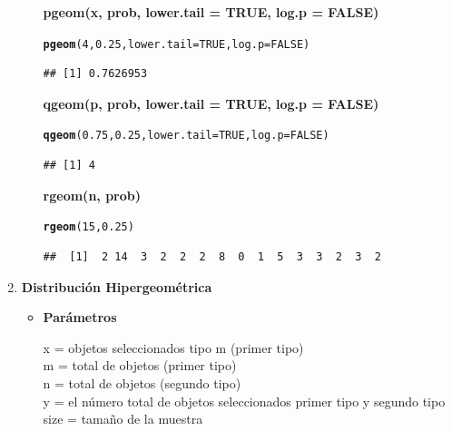 \documentclass[12pt,letterpaper]{article}\usepackage[]{graphicx}\usepackage[]{color}
\makeatletter
\newcommand{\hlnum}[1]{\textcolor[rgb]{0.686,0.059,0.569}{#1}}%
\newcommand{\hlstd}[1]{\textcolor[rgb]{0.345,0.345,0.345}{#1}}%
\newcommand{\hlkwc}[1]{\textcolor[rgb]{0.333,0.667,0.333}{#1}}%
\newcommand{\hlkwd}[1]{\textcolor[rgb]{0.737,0.353,0.396}{\textbf{#1}}}%
\newenvironment{kframe}{%
 \def\at@end@of@kframe{}%
 \ifinner\ifhmode%
  \def\at@end@of@kframe{\end{minipage}}%
  \begin{minipage}{\columnwidth}%
 \fi\fi%
 \def\FrameCommand##1{\hskip\@totalleftmargin \hskip-\fboxsep
 \colorbox{shadecolor}{##1}\hskip-\fboxsep
     \hskip-\linewidth \hskip-\@totalleftmargin \hskip\columnwidth}%
 \MakeFramed {\advance\hsize-\width
   \@totalleftmargin\z@ \linewidth\hsize
   \@setminipage}}%
 {\par\unskip\endMakeFramed%
 \at@end@of@kframe}
\newenvironment{knitrout}{}{} %
\makeatother
\begin{document}
\begin{enumerate}
\begin{itemize}
\textbf{pgeom(x, prob, lower.tail = TRUE, log.p = FALSE)}
\begin{knitrout}
\color{fgcolor}\begin{kframe}
\begin{alltt}
\hlkwd{pgeom}\hlstd{(}\hlnum{4}\hlstd{,} \hlnum{0.25}\hlstd{,} \hlkwc{lower.tail} \hlstd{=} \hlnum{TRUE}\hlstd{,} \hlkwc{log.p} \hlstd{=} \hlnum{FALSE}\hlstd{)}
\end{alltt}
\begin{verbatim}
## [1] 0.7626953
\end{verbatim}
\end{kframe}
\end{knitrout}

\textbf{qgeom(p, prob, lower.tail = TRUE, log.p = FALSE)}
\begin{knitrout}
\color{fgcolor}\begin{kframe}
\begin{alltt}
\hlkwd{qgeom}\hlstd{(}\hlnum{0.75}\hlstd{,} \hlnum{0.25}\hlstd{,} \hlkwc{lower.tail} \hlstd{=} \hlnum{TRUE}\hlstd{,} \hlkwc{log.p} \hlstd{=} \hlnum{FALSE}\hlstd{)}
\end{alltt}
\begin{verbatim}
## [1] 4
\end{verbatim}
\end{kframe}
\end{knitrout}

\textbf{rgeom(n, prob)}
\begin{knitrout}
\color{fgcolor}\begin{kframe}
\begin{alltt}
\hlkwd{rgeom}\hlstd{(}\hlnum{15}\hlstd{,} \hlnum{0.25}\hlstd{)}
\end{alltt}
\begin{verbatim}
##  [1]  2 14  3  2  2  2  8  0  1  5  3  3  2  3  2
\end{verbatim}
\end{kframe}
\end{knitrout}
\end{itemize}

\item  \textbf{Distribuci\'on Hipergeom\'etrica}
\begin{itemize}
\item \textbf{Par\'ametros}
\begin{center}
x = objetos seleccionados tipo m (primer tipo)\\
m = total de objetos (primer tipo)\\
n = total de objetos (segundo tipo)\\
y = el n\'umero total de objetos seleccionados primer tipo y segundo tipo\\ 
size = tama\~no de la muestra\\ 
\end{center}
  

\end{itemize}
\end{enumerate}
\end{document}
